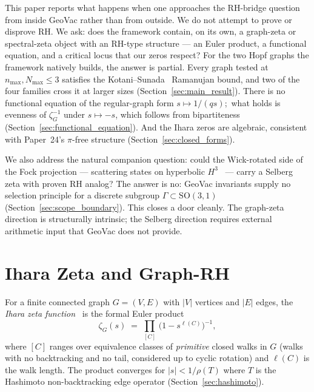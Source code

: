 \documentclass[11pt]{article}
\begin{document}
This paper reports what happens when one approaches the RH-bridge
question from inside GeoVac rather than from outside.  We do not
attempt to prove or disprove RH.  We ask: does the framework contain,
on its own, a graph-zeta or spectral-zeta object with an RH-type
structure --- an Euler product, a functional equation, and a critical
locus that our zeros respect?  For the two Hopf graphs the framework
natively builds, the answer is partial.  Every graph tested at
$n_{\max},N_{\max}\le 3$ satisfies the Kotani--Sunada~\cite{kotani2000}
Ramanujan bound, and two of the four families cross it at larger
sizes (Section~\ref{sec:main_result}).  There is no functional equation of
the regular-graph form $s\mapsto 1/(q s)$;\ what holds is evenness of
$\zeta_G^{-1}$ under $s\mapsto -s$, which follows from bipartiteness
(Section~\ref{sec:functional_equation}).  And the Ihara zeros are
algebraic, consistent with Paper~24's $\pi$-free structure
(Section~\ref{sec:closed_forms}).

We also address the natural companion question: could the Wick-rotated
side of the Fock projection --- scattering states on hyperbolic
$H^3$~\cite{bander1966} --- carry a Selberg zeta with proven RH analog?
The answer is no: GeoVac invariants supply no selection principle for
a discrete subgroup $\Gamma\subset\mathrm{SO}(3,1)$
(Section~\ref{sec:scope_boundary}).  This closes a door cleanly.  The
graph-zeta direction is structurally intrinsic; the Selberg direction
requires external arithmetic input that GeoVac does not provide.

\section{Ihara Zeta and Graph-RH}
\label{sec:ihara_background}

For a finite connected graph $G=(V,E)$ with $|V|$ vertices and $|E|$
edges, the \emph{Ihara zeta function}~\cite{ihara1966} is the formal
Euler product
\begin{equation}
\zeta_G(s) \;=\; \prod_{[C]}\,\bigl(1 - s^{\ell(C)}\bigr)^{-1},
\label{eq:ihara_euler}
\end{equation}
where $[C]$ ranges over equivalence classes of \emph{primitive} closed
walks in $G$ (walks with no backtracking and no tail, considered up to
cyclic rotation) and $\ell(C)$ is the walk length.  The product
converges for $|s|<1/\rho(T)$ where $T$ is the Hashimoto
non-backtracking edge operator (Section~\ref{sec:hashimoto}).
\end{document}
